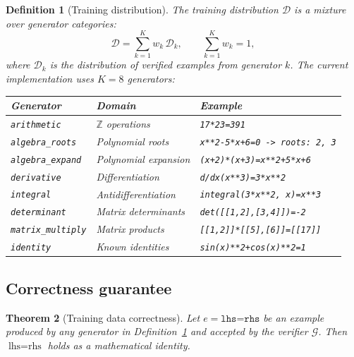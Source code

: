 \documentclass[11pt,a4paper]{article}
\newtheorem{theorem}{Theorem}[section]
\newtheorem{definition}[theorem]{Definition}
\newcommand{\Z}{\mathbb{Z}}
\newcommand{\cD}{\mathcal{D}}
\newcommand{\cG}{\mathcal{G}}
\begin{document}
\begin{definition}[Training distribution]\label{def:dist}
The training distribution $\cD$ is a mixture over
generator categories:
\begin{equation}\label{eq:generators}
\cD = \sum_{k=1}^{K} w_k \, \cD_k,
\qquad
\sum_{k=1}^{K} w_k = 1,
\end{equation}
where $\cD_k$ is the distribution of verified examples
from generator $k$.
The current implementation uses $K = 8$ generators:
\begin{center}
\small
\renewcommand{\arraystretch}{1.1}
\begin{tabular}{@{}lll@{}}
\toprule
\textbf{Generator} & \textbf{Domain} & \textbf{Example} \\
\midrule
\texttt{arithmetic} & $\Z$ operations & \texttt{17*23=391} \\
\texttt{algebra\_roots} & Polynomial roots & \texttt{x**2-5*x+6=0 -> roots: 2, 3} \\
\texttt{algebra\_expand} & Polynomial expansion & \texttt{(x+2)*(x+3)=x**2+5*x+6} \\
\texttt{derivative} & Differentiation & \texttt{d/dx(x**3)=3*x**2} \\
\texttt{integral} & Antidifferentiation & \texttt{integral(3*x**2, x)=x**3} \\
\texttt{determinant} & Matrix determinants & \texttt{det([[1,2],[3,4]])=-2} \\
\texttt{matrix\_multiply} & Matrix products & \texttt{[[1,2]]*[[5],[6]]=[[17]]} \\
\texttt{identity} & Known identities & \texttt{sin(x)**2+cos(x)**2=1} \\
\bottomrule
\end{tabular}
\end{center}
\end{definition}

\subsection{Correctness guarantee}

\begin{theorem}[Training data correctness]\label{thm:correct}
Let $e = \texttt{lhs=rhs}$ be an example produced by any
generator in Definition~\ref{def:dist} and accepted by the
verifier $\cG$.
Then $\text{lhs} = \text{rhs}$ holds as a mathematical identity.
\end{theorem}
\end{document}
